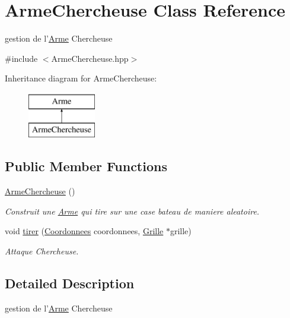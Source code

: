 \hypertarget{classArmeChercheuse}{\section{Arme\-Chercheuse Class Reference}
\label{classArmeChercheuse}
}


gestion de l'\hyperlink{classArme}{Arme} Chercheuse  




{\ttfamily \#include $<$Arme\-Chercheuse.\-hpp$>$}

Inheritance diagram for Arme\-Chercheuse\-:\begin{figure}[H]
\begin{center}
\leavevmode
\includegraphics[height=2.000000cm]{classArmeChercheuse}
\end{center}
\end{figure}
\subsection*{Public Member Functions}
\begin{DoxyCompactItemize}
\item 
\hyperlink{classArmeChercheuse_acbcf8babee6bff7492933e739dfeeae0}{Arme\-Chercheuse} ()
\begin{DoxyCompactList}\small\item\em Construit une \hyperlink{classArme}{Arme} qui tire sur une case bateau de maniere aleatoire. \end{DoxyCompactList}\item 
void \hyperlink{classArmeChercheuse_ad3584a57b7b4fcee261b87fdd3c33806}{tirer} (\hyperlink{classCoordonnees}{Coordonnees} coordonnees, \hyperlink{classGrille}{Grille} $\ast$grille)
\begin{DoxyCompactList}\small\item\em Attaque Chercheuse. \end{DoxyCompactList}\end{DoxyCompactItemize}


\subsection{Detailed Description}
gestion de l'\hyperlink{classArme}{Arme} Chercheuse 

